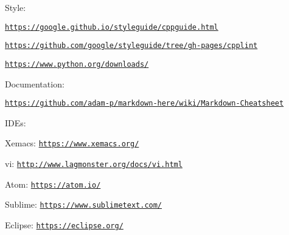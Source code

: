 Style\+:
\begin{DoxyItemize}
\item \href{https://google.github.io/styleguide/cppguide.html}{\tt https\+://google.\+github.\+io/styleguide/cppguide.\+html}
\item \href{https://github.com/google/styleguide/tree/gh-pages/cpplint}{\tt https\+://github.\+com/google/styleguide/tree/gh-\/pages/cpplint}
\item \href{https://www.python.org/downloads/}{\tt https\+://www.\+python.\+org/downloads/}
\end{DoxyItemize}

Documentation\+:
\begin{DoxyItemize}
\item \href{https://github.com/adam-p/markdown-here/wiki/Markdown-Cheatsheet}{\tt https\+://github.\+com/adam-\/p/markdown-\/here/wiki/\+Markdown-\/\+Cheatsheet}
\end{DoxyItemize}

I\+D\+Es\+:
\begin{DoxyItemize}
\item Xemacs\+: \href{https://www.xemacs.org/}{\tt https\+://www.\+xemacs.\+org/}
\item vi\+: \href{http://www.lagmonster.org/docs/vi.html}{\tt http\+://www.\+lagmonster.\+org/docs/vi.\+html}
\item Atom\+: \href{https://atom.io/}{\tt https\+://atom.\+io/}
\item Sublime\+: \href{https://www.sublimetext.com/}{\tt https\+://www.\+sublimetext.\+com/}
\item Eclipse\+: \href{https://eclipse.org/}{\tt https\+://eclipse.\+org/} 
\end{DoxyItemize}